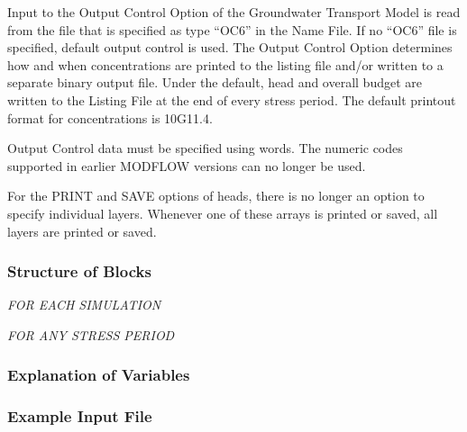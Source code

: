 Input to the Output Control Option of the Groundwater Transport Model is read from the file that is specified as type ``OC6'' in the Name File. If no ``OC6'' file is specified, default output control is used. The Output Control Option determines how and when concentrations are printed to the listing file and/or written to a separate binary output file.  Under the default, head and overall budget are written to the Listing File at the end of every stress period. The default printout format for concentrations is 10G11.4.

Output Control data must be specified using words.  The numeric codes supported in earlier MODFLOW versions can no longer be used.

For the PRINT and SAVE options of heads, there is no longer an option to specify individual layers.  Whenever one of these arrays is printed or saved, all layers are printed or saved.

\vspace{5mm}
\subsubsection{Structure of Blocks}
\vspace{5mm}

\noindent \textit{FOR EACH SIMULATION}

\vspace{5mm}
\noindent \textit{FOR ANY STRESS PERIOD}


\vspace{5mm}
\subsubsection{Explanation of Variables}
\begin{description}

\end{description}

\vspace{5mm}
\subsubsection{Example Input File}

